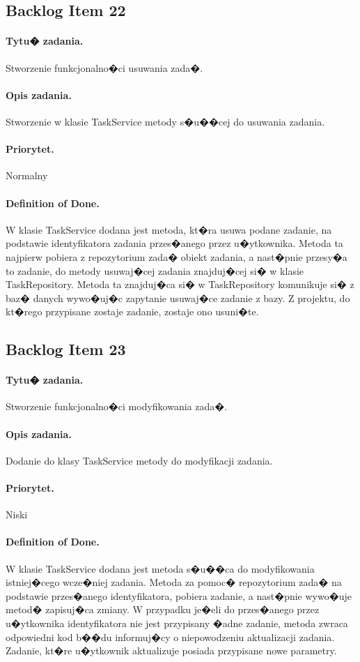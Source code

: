 ﻿\documentclass[a4paper]{article}
\begin{document}
\subsection{Backlog Item 22} 
\paragraph{Tytu� zadania.}  Stworzenie funkcjonalno�ci usuwania zada�.
\paragraph{Opis zadania.} Stworzenie w klasie TaskService metody s�u��cej do usuwania zadania. 
\paragraph{Priorytet.} Normalny
\paragraph{Definition of Done.} W klasie TaskService dodana jest metoda, kt�ra usuwa podane zadanie, na podstawie identyfikatora zadania przes�anego przez u�ytkownika. Metoda ta najpierw pobiera z repozytorium zada� obiekt zadania, a nast�pnie przesy�a to zadanie, do metody usuwaj�cej zadania znajduj�cej si� w klasie TaskRepository. Metoda ta znajduj�ca si� w TaskRepository komunikuje si� z baz� danych wywo�uj�c zapytanie usuwaj�ce zadanie z bazy. Z projektu, do kt�rego przypisane zostaje zadanie, zostaje ono usuni�te.

\subsection{Backlog Item 23} 
\paragraph{Tytu� zadania.} Stworzenie funkcjonalno�ci modyfikowania zada�.
\paragraph{Opis zadania.} Dodanie do klasy TaskService metody do modyfikacji zadania.
\paragraph{Priorytet.} Niski
\paragraph{Definition of Done.} W klasie TaskService dodana jest metoda s�u��ca do modyfikowania istniej�cego wcze�niej zadania. Metoda za pomoc� repozytorium zada� na podstawie przes�anego identyfikatora, pobiera zadanie, a nast�pnie wywo�uje metod� zapisuj�ca zmiany. W przypadku je�eli do przes�anego przez u�ytkownika identyfikatora nie jest przypisany �adne zadanie, metoda zwraca odpowiedni kod b��du informuj�cy o niepowodzeniu aktualizacji zadania. Zadanie, kt�re u�ytkownik aktualizuje posiada przypisane nowe parametry.
\end{document}
